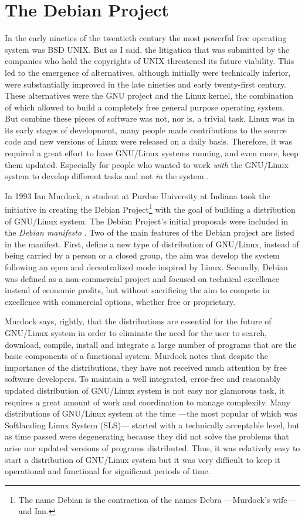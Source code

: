 \section{The Debian Project}

In the early nineties of the twentieth century the most powerful free operating system was BSD UNIX. But as I said, the litigation that was submitted by the companies who hold the copyrights of UNIX threatened its future viability. This led to the emergence of alternatives, although initially were technically inferior, were substantially improved in the late nineties and early twenty-first century. These alternatives were the GNU project and the Linux kernel, the combination of which allowed to build a completely free general purpose operating system. But combine these pieces of software was not, nor is, a trivial task. Linux was in its early stages of development, many people made contributions to the source code and new versions of Linux were released on a daily basis. Therefore, it was required a great effort to have GNU/Linux systems running, and even more, keep them updated. Especially for people who wanted to work \emph{with} the GNU/Linux system to develop different tasks and not \emph{in} the system \citep[30]{krafft:2005}.

In 1993 Ian Murdock, a student at Purdue University at Indiana took the initiative in creating the Debian Project\footnote{The name Debian is the contraction of the names Debra ---Murdock's wife--- and Ian.} with the goal of building a distribution of GNU/Linux system. The Debian Project's initial proposals were included in the \emph{Debian manifesto} \citep{murdock:1994}. Two of the main features of the Debian project are listed in the manifest. First, define a new type of distribution of GNU/Linux, instead of being carried by a person or a closed group, the aim was develop the system following an open and decentralized mode inspired by Linux. Secondly, Debian was defined as a non-commercial project and focused on technical excellence instead of economic profits, but without sacrificing the aim to compete in excellence with commercial options, whether free or proprietary.

Murdock says, rightly, that the distributions are essential for the future of GNU/Linux system in order to eliminate the need for the user to search, download, compile, install and integrate a large number of programs that are the basic components of a functional system. Murdock notes that despite the importance of the distributions, they have not received much attention by free software developers. To maintain a well integrated, error-free and reasonably updated distribution of GNU/Linux system is not easy nor glamorous task, it requires a great amount of work and coordination to manage complexity. Many distributions of GNU/Linux system at the time ---the most popular of which was Softlanding Linux System (SLS)--- started with a technically acceptable level, but as time passed were degenerating because they did not solve the problems that arise nor updated versions of programs distributed. Thus, it was relatively easy to start a distribution of GNU/Linux system but it was very difficult to keep it operational and functional for significant periods of time.

